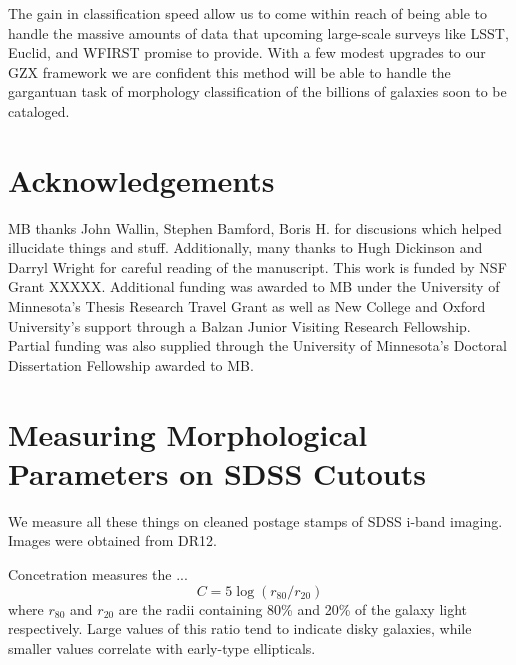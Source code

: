 \documentclass[twocolumn]{aastex6}
\newcommand{\rr}[1]{$r_{#1}$}
\begin{document}
The gain in classification speed allow us to come within reach of being able to 
handle the massive amounts of data that upcoming large-scale surveys like LSST, 
Euclid, and WFIRST promise to provide. With a few modest upgrades to our GZX 
framework we are confident this method will be able to handle the gargantuan 
task of morphology classification of the billions of galaxies soon to be cataloged. 



\section{Acknowledgements}
MB thanks John Wallin, Stephen Bamford, Boris H. for discusions which helped illucidate things and stuff. 
Additionally, many thanks to Hugh Dickinson and Darryl Wright for careful reading of the manuscript. 
This work is funded by NSF Grant XXXXX. Additional funding was awarded to MB 
under the University of Minnesota's Thesis Research Travel Grant as well as
New College and Oxford University's support through a Balzan Junior Visiting 
Research Fellowship. Partial funding was also supplied through the University of
Minnesota's Doctoral Dissertation Fellowship awarded to MB. 





\appendix

\section{Measuring Morphological Parameters on SDSS Cutouts}
\label{sec:Appendix}

We measure all these things on cleaned postage stamps of SDSS i-band imaging. 
Images were obtained from DR12. 


Concetration measures the ... 
\begin{equation}
C = 5\log(r_{80}/ r_{20})
\end{equation}
where \rr{80} and \rr{20} are the radii containing 80\% and 20\% of the galaxy light respectively.  Large values of this ratio tend to indicate disky galaxies, while smaller values correlate with early-type ellipticals. 
\end{document}

